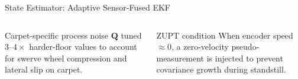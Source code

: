 \documentclass[aspectratio=169, 10pt]{beamer}
\newcommand{\Qk}{\mathbf{Q}}
\begin{document}
\begin{frame}{State Estimator: Adaptive Sensor-Fused EKF}
\begin{columns}[T]
  \vspace{6pt}
  \begin{alertblock}{Carpet-specific process noise}
    \small $\Qk$ tuned $3\text{–}4\times$ harder-floor values to account
    for swerve wheel compression and lateral slip on carpet.
  \end{alertblock}

  \vspace{6pt}
  \begin{exampleblock}{ZUPT condition}
    \small When encoder speed $\approx 0$, a zero-velocity pseudo-measurement
    is injected to prevent covariance growth during standstill.
  \end{exampleblock}

\end{columns}
\end{frame}
\end{document}
